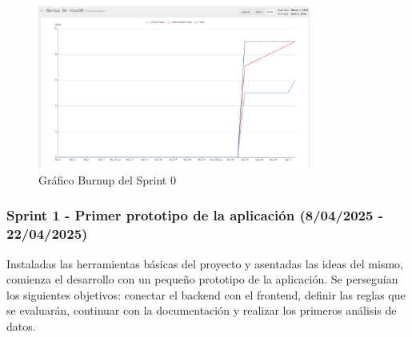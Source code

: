 \begin{figure}[H]
\centering
\includegraphics[width=0.8\textwidth]{img/BurnupS0.png}
\caption{Gráfico Burnup del Sprint 0}
\label{fig:BurnupS0}
\end{figure}

\subsubsection{Sprint 1 - Primer prototipo de la aplicación (8/04/2025 - 22/04/2025)}

Instaladas las herramientas básicas del proyecto y asentadas las ideas del mismo, comienza el desarrollo con un pequeño prototipo de la aplicación. Se perseguían los siguientes objetivos: conectar el backend con el frontend, definir las reglas que se evaluarán, continuar con la documentación y realizar los primeros análisis de datos.

